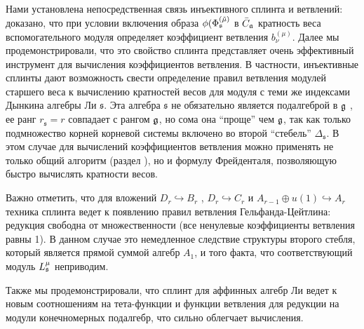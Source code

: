\label{sec:4-conclusions}

Нами установлена непосредственная связь инъективного сплинта и ветвлений: доказано, что при условии включения образа $\phi(\Phi_{\mathfrak{s}}^{(\tilde \mu)}$ в $\bar C_{\mathfrak{a}}$ кратность веса вспомогательного модуля определяет коэффициент ветвления $b_{\nu}^{(\mu)}$. Далее мы продемонстрировали, что это свойство сплинта представляет очень эффективный инструмент для вычисления коэффициентов ветвления.  В частности, инъективные сплинты дают возможность свести определение правил ветвления модулей старшего веса к вычислению кратностей весов для модуля с теми же индексами Дынкина алгебры Ли $\mathfrak{s}$. Эта алгебра $\mathfrak{s}$ не обязательно является подалгеброй в  $\mathfrak{g}$ , ее ранг $r_{\mathfrak{s}}=r$ совпадает с рангом $\mathfrak{g}$, но сома она ``проще'' чем  $\mathfrak{g}$, так как только подмножество корней корневой системы включено во второй ``стебель''  $\Delta_{\mathfrak{s}}$. В этом случае для вычислений коэффициентов ветвления можно применять не только общий алгоритм (раздел \label{sec:algorithm}), но и формулу Фрейденталя, позволяющую быстро вычислять кратности весов. 

Важно отметить, что для вложений  $D_{r}\hookrightarrow B_{r}$ , $D_{r}\hookrightarrow C_{r}$ и $A_{r-1}\oplus u\left( 1\right) \hookrightarrow A_{r}$ техника сплинта ведет к появлению правил ветвления Гельфанда-Цейтлина: редукция свободна от множественности (все ненулевые коэффициенты ветвления равны 1). В данном случае это немедленное следствие структуры второго стебля, который является прямой суммой алгебр $A_{1}$, и того факта, что соответствующий модуль $L_{\mathfrak{s}}^{\mu }$ неприводим.

Также мы продемонстрировали, что сплинт для аффинных алгебр Ли ведет к новым соотношениям на тета-функции и функции ветвления для редукции на модули конечномерных подалгебр, что сильно облегчает вычисления.






